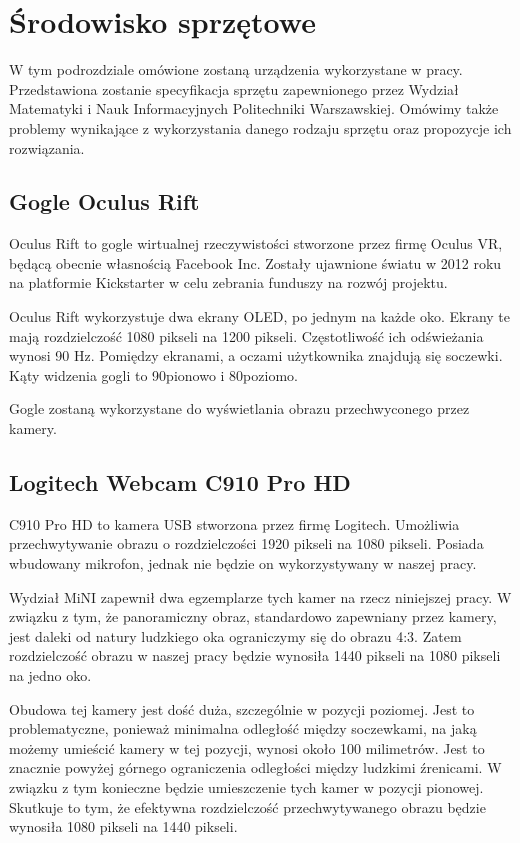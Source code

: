 \documentclass[a4paper,11pt,twoside]{report}
\theoremstyle{definition}
\begin{document}
\section{Środowisko sprzętowe}

W tym podrozdziale omówione zostaną urządzenia wykorzystane w pracy. Przedstawiona zostanie specyfikacja sprzętu zapewnionego przez Wydział Matematyki i Nauk Informacyjnych Politechniki Warszawskiej. Omówimy także problemy wynikające z wykorzystania danego rodzaju sprzętu oraz propozycje ich rozwiązania.

\subsection{Gogle Oculus Rift}

Oculus Rift to gogle wirtualnej rzeczywistości stworzone przez firmę Oculus VR, będącą obecnie własnością Facebook Inc. Zostały ujawnione światu w 2012 roku na platformie Kickstarter w celu zebrania funduszy na rozwój projektu. 

Oculus Rift wykorzystuje dwa ekrany OLED, po jednym na każde oko. Ekrany te mają rozdzielczość 1080 pikseli na 1200 pikseli. Częstotliwość ich odświeżania wynosi 90 Hz. Pomiędzy ekranami, a oczami użytkownika znajdują się soczewki. Kąty widzenia gogli to 90\textdegree  pionowo i 80\textdegree  poziomo.

Gogle zostaną wykorzystane do wyświetlania obrazu przechwyconego przez kamery.

\subsection{Logitech Webcam C910 Pro HD}

C910 Pro HD to kamera USB stworzona przez firmę Logitech. Umożliwia przechwytywanie obrazu o rozdzielczości 1920 pikseli na 1080 pikseli. Posiada wbudowany mikrofon, jednak nie będzie on wykorzystywany w naszej pracy.

Wydział MiNI zapewnił dwa egzemplarze tych kamer na rzecz niniejszej pracy. W związku z tym, że panoramiczny obraz, standardowo zapewniany przez kamery, jest daleki od natury ludzkiego oka ograniczymy się do obrazu 4:3. Zatem rozdzielczość obrazu w naszej pracy będzie wynosiła 1440 pikseli na 1080 pikseli na jedno oko.

Obudowa tej kamery jest dość duża, szczególnie w pozycji poziomej. Jest to problematyczne, ponieważ minimalna odległość między soczewkami, na jaką możemy umieścić kamery w tej pozycji, wynosi około 100 milimetrów. Jest to znacznie powyżej górnego ograniczenia odległości między ludzkimi źrenicami. W związku z tym konieczne będzie umieszczenie tych kamer w pozycji pionowej. Skutkuje to tym, że efektywna rozdzielczość przechwytywanego obrazu będzie wynosiła 1080 pikseli na 1440 pikseli.
\end{document}
